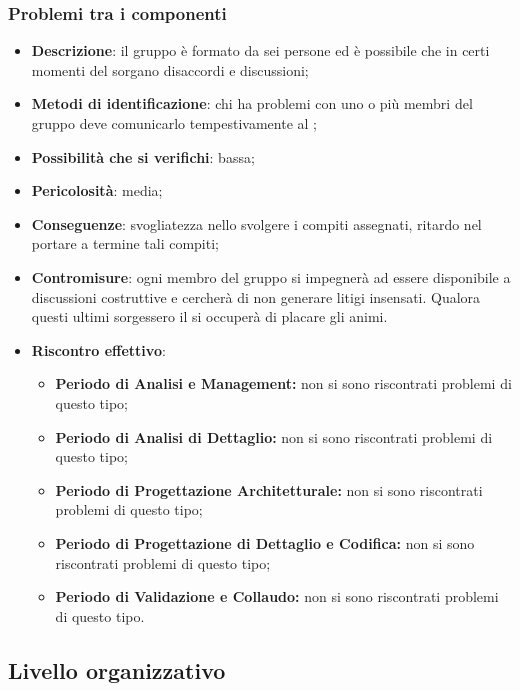 		\subsubsection{Problemi tra i componenti}
		\begin{itemize}
			\item \textbf{Descrizione}: il gruppo è formato da sei persone ed è possibile che in certi momenti del  sorgano disaccordi e discussioni;
			\item \textbf{Metodi di identificazione}: chi ha problemi con uno o più membri del gruppo deve comunicarlo tempestivamente al \RES{};
			\item \textbf{Possibilità che si verifichi}: bassa;
			\item \textbf{Pericolosità}: media;
			\item \textbf{Conseguenze}: svogliatezza nello svolgere i compiti assegnati, ritardo nel portare a termine tali compiti;
			\item \textbf{Contromisure}: ogni membro del gruppo si impegnerà ad essere disponibile a discussioni costruttive e cercherà di non generare litigi insensati. Qualora questi ultimi sorgessero il \RES{} si occuperà di placare gli animi.
			\item \textbf{Riscontro effettivo}:
			\begin{itemize}
				\item \textbf{Periodo di Analisi e Management:} non si sono riscontrati problemi di questo tipo;
				\item \textbf{Periodo di Analisi di Dettaglio:} non si sono riscontrati problemi di questo tipo;
				\item \textbf{Periodo di Progettazione Architetturale:} non si sono riscontrati problemi di questo tipo;
            \item \textbf{Periodo di Progettazione di Dettaglio e Codifica:} non si sono riscontrati problemi di questo tipo;
            \item \textbf{Periodo di Validazione e Collaudo:} non si sono riscontrati problemi di questo tipo.
			\end{itemize}
		\end{itemize}

	\subsection{Livello organizzativo}
